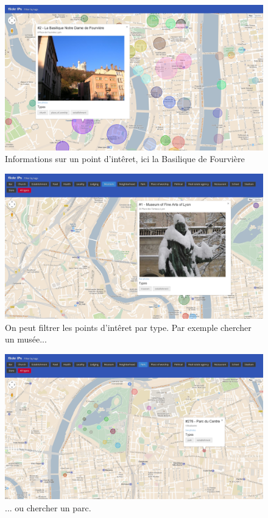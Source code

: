     \begin{figure}[H]
        \centering
        \includegraphics[scale=0.25]{../screenshots/ui-info-cluster.png}
        \caption{Informations sur un point d'intêret, ici la Basilique de Fourvière}
        \label{diagram:ui-info-cluster}
    \end{figure}

    \begin{figure}[H]
        \centering
        \includegraphics[scale=0.25]{../screenshots/ui-filter-museum.png}
        \caption{On peut filtrer les points d'intêret par type. Par exemple chercher un musée...}
        \label{diagram:ui-filter-museum}
    \end{figure}

    \begin{figure}[H]
        \centering
        \includegraphics[scale=0.25]{../screenshots/ui-filter-park.png}
        \caption{... ou chercher un parc.}
        \label{diagram:ui-filter-park}
    \end{figure}

    \pagebreak

